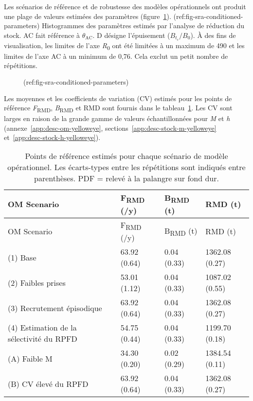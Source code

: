 \documentclass[11pt]{book}
\begin{document}
Les scénarios de référence et de robustesse des modèles opérationnels ont produit une plage de valeurs estimées des paramètres (figure~\ref{fig:sra-conditioned-parameters}). (ref:fig-sra-conditioned-parameters) Histogrammes des paramètres estimés par l'analyse de réduction du stock. AC fait référence à \(\theta_\textrm{AC}\). D désigne l'épuisement (\(B_{t_c}/B_0\)). À des fins de visualisation, les limites de l'axe \emph{R}\textsubscript{0} ont été limitées à un maximum de 490 et les limites de l'axe AC à un minimum de 0,76. Cela exclut un petit nombre de répétitions.
\begin{figure}[htb]

{\centering {} 

}

\caption{(ref:fig-sra-conditioned-parameters)}\label{fig:sra-conditioned-parameters}
\end{figure}
Les moyennes et les coefficients de variation (CV) estimés pour les points de référence \emph{F}\textsubscript{RMD}, \emph{B}\textsubscript{RMD} et RMD sont fournis dans le tableau~\ref{tab:sra-ref-pts}. Les CV sont larges en raison de la grande gamme de valeurs échantillonnées pour \emph{M} et \emph{h} (annexe~\ref{app:desc-om-yelloweye}, sections~\ref{app:desc-stock-m-yelloweye} et~\ref{app:desc-stock-h-yelloweye}).
\begin{longtable}[]{@{}llll@{}}
\caption{\label{tab:sra-ref-pts}Points de référence estimés pour chaque scénario de modèle opérationnel. Les écarts-types entre les répétitions sont indiqués entre parenthèses. PDF = relevé à la palangre sur fond dur.}\tabularnewline
\toprule
OM Scenario & F\textsubscript{RMD} (/y) & B\textsubscript{RMD} (t) & RMD (t)\tabularnewline
\midrule
\endfirsthead
\toprule
OM Scenario & F\textsubscript{RMD} (/y) & B\textsubscript{RMD} (t) & RMD (t)\tabularnewline
\midrule
\endhead
(1) Base & 63.92 (0.64) & 0.04 (0.33) & 1362.08 (0.27)\tabularnewline
(2) Faibles prises & 53.01 (1.12) & 0.04 (0.33) & 1087.02 (0.55)\tabularnewline
(3) Recrutement épisodique & 63.92 (0.64) & 0.04 (0.33) & 1362.08 (0.27)\tabularnewline
(4) Estimation de la sélectivité du RPFD & 54.75 (0.44) & 0.04 (0.33) & 1199.70 (0.18)\tabularnewline
(A) Faible M & 34.30 (0.20) & 0.02 (0.29) & 1384.54 (0.11)\tabularnewline
(B) CV élevé du RPFD & 63.92 (0.64) & 0.04 (0.33) & 1362.08 (0.27)\tabularnewline
\bottomrule
\end{longtable}
\clearpage
\end{document}
